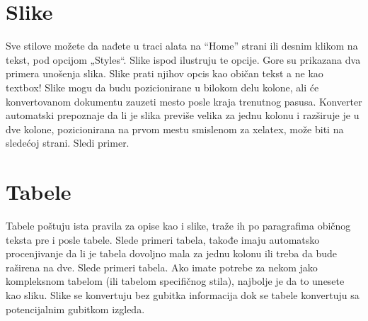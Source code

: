 \section{Slike}
Sve stilove možete da nađete u traci alata na ``Home'' strani ili desnim klikom na tekst, pod opcijom „Styles“. Slike ispod ilustruju te opcije.
Gore su prikazana dva primera unošenja slika. Slike prati njihov opcis kao običan tekst a ne kao textbox! Slike mogu da budu pozicionirane u bilokom delu kolone, ali će konvertovanom dokumentu zauzeti mesto posle kraja trenutnog pasusa.
Konverter automatski prepoznaje da li je slika previše velika za jednu kolonu i razširuje je u dve kolone, pozicionirana na prvom mestu smislenom za xelatex, može biti na sledećoj strani. Sledi primer.
\section{Tabele}
Tabele poštuju ista pravila za opise kao i slike, traže ih po paragrafima običnog teksta pre i posle tabele. Slede primeri tabela, takođe imaju automatsko procenjivanje da li je tabela dovoljno mala za jednu kolonu ili treba da bude raširena na dve. Slede primeri tabela.
Ako imate potrebe za nekom jako kompleksnom tabelom (ili tabelom specifičnog stila), najbolje je da to unesete kao sliku. Slike se konvertuju bez gubitka informacija dok se tabele konvertuju sa potencijalnim gubitkom izgleda.
